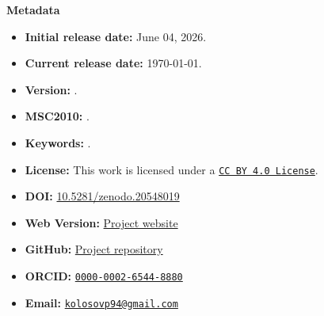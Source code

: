 {\large\textbf{Metadata}}
\begin{itemize}[leftmargin=22pt]
  \item \textbf{Initial release date:} June 04, 2026.
  \item \textbf{Current release date:} \today.
  \item \textbf{Version:} .
  \item \textbf{MSC2010:} .
  \item \textbf{Keywords:} .
  \item \textbf{License:} This work is licensed under a \href{https://creativecommons.org/licenses/by/4.0/}{\texttt{CC BY 4.0 License}}.
  \item \textbf{DOI:} \href{https://doi.org/10.5281/zenodo.20548019}{10.5281/zenodo.20548019}
  \item \textbf{Web Version:} \href{https://kolosovpetro.github.io/math/sums-of-powers-framework-for-closed-forms/}{Project website}
  \item \textbf{GitHub:} \href{https://github.com/kolosovpetro/SumsOfPowersACompleteFrameworkForClosedForms}{Project repository}
  \item \textbf{ORCID:} \href{https://orcid.org/0000-0002-6544-8880}{\texttt{0000-0002-6544-8880}}
  \item \textbf{Email:} \href{mailto:kolosovp94@gmail.com}{\texttt{kolosovp94@gmail.com}}
\end{itemize}
